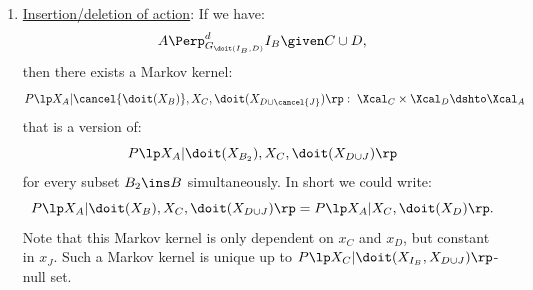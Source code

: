 \begin{Cor}[Do-calculus]
\begin{enumerate}
            Such a Markov kernel is unique up to $P\lp X_B,X_C|\doit(X_{I_B},X_{D\cup J})\rp$-null set.
         \item \underline{Insertion/deletion of action}: If we have:
            \[ A \Perp^d_{G_{\doit(I_B,D)}} I_B \given C  \cup D,   \]
            then there exists a Markov kernel: 
            \[P\lp X_A|\cancel{\doit(X_B)},X_C,\doit(X_{D\cup \cancel{J}})\rp:\; \Xcal_C \times \Xcal_{D} \dshto \Xcal_A\] 
            that is a version of:  
            \[ P\lp X_A|\doit(X_{B_2}),X_C,\doit(X_{D\cup J})\rp\]
            for every subset $B_2 \ins B$ simultaneously. In short we could write:
            \[ P\lp X_A|\doit(X_B),X_C,\doit(X_{D\cup J})\rp =   P\lp X_A|X_C,\doit(X_{D})\rp.\]
            Note that this Markov kernel is only dependent on $x_C$ and $x_{D}$, but constant in $x_J$.
            Such a Markov kernel is unique up to $P\lp X_C|\doit(X_{I_B},X_{D\cup J})\rp$-null set.

\end{enumerate}
\end{Cor}

